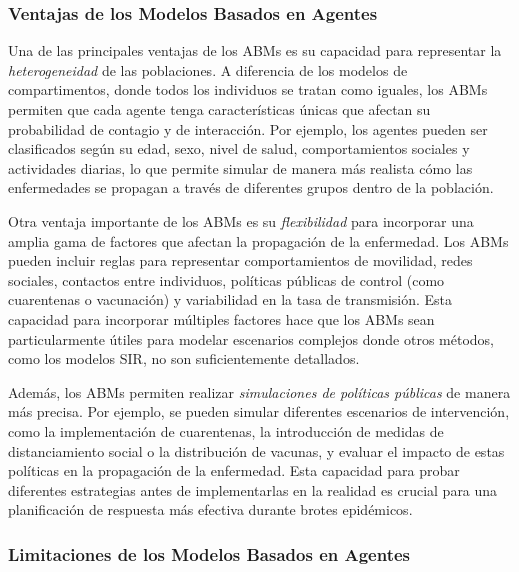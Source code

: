 \subsubsection{Ventajas de los Modelos Basados en Agentes}

Una de las principales ventajas de los ABMs es su capacidad para representar la \textit{heterogeneidad} de las poblaciones. A diferencia de los modelos de compartimentos, donde todos los individuos se tratan como iguales, los ABMs permiten que cada agente tenga características únicas que afectan su probabilidad de contagio y de interacción. Por ejemplo, los agentes pueden ser clasificados según su edad, sexo, nivel de salud, comportamientos sociales y actividades diarias, lo que permite simular de manera más realista cómo las enfermedades se propagan a través de diferentes grupos dentro de la población\parencite{Chowell2016EarlyGrowth, Rodriguez2022DataCentric, Mata2021MathematicalEpidemics}.

Otra ventaja importante de los ABMs es su \textit{flexibilidad} para incorporar una amplia gama de factores que afectan la propagación de la enfermedad. Los ABMs pueden incluir reglas para representar comportamientos de movilidad, redes sociales, contactos entre individuos, políticas públicas de control (como cuarentenas o vacunación) y variabilidad en la tasa de transmisión. Esta capacidad para incorporar múltiples factores hace que los ABMs sean particularmente útiles para modelar escenarios complejos donde otros métodos, como los modelos SIR, no son suficientemente detallados\parencite{Mata2021MathematicalEpidemics, Nowzari2016ComplexNetworks, Chowell2016EarlyGrowth}.

Además, los ABMs permiten realizar \textit{simulaciones de políticas públicas} de manera más precisa. Por ejemplo, se pueden simular diferentes escenarios de intervención, como la implementación de cuarentenas, la introducción de medidas de distanciamiento social o la distribución de vacunas, y evaluar el impacto de estas políticas en la propagación de la enfermedad. Esta capacidad para probar diferentes estrategias antes de implementarlas en la realidad es crucial para una planificación de respuesta más efectiva durante brotes epidémicos\parencite{Rodriguez2022DataCentric, Shinde2020ForecastingCOVID}.

\subsubsection{Limitaciones de los Modelos Basados en Agentes}

